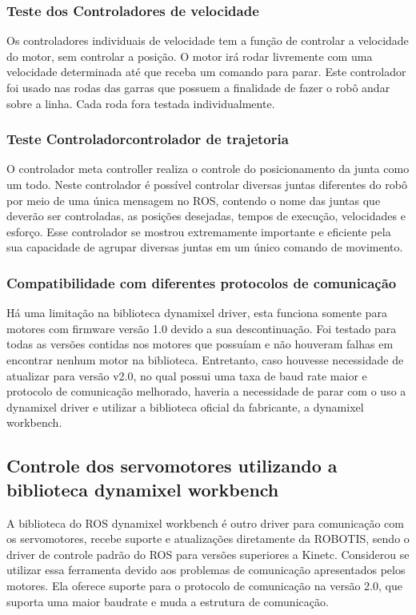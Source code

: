 \subsubsection{Teste dos Controladores de velocidade}
Os controladores individuais de velocidade tem a função de controlar a velocidade do motor, sem controlar a posição. O motor irá rodar livremente com uma velocidade determinada até que receba um comando para parar. Este controlador foi usado nas rodas das garras que possuem a finalidade de fazer o robô andar sobre a linha. Cada roda fora testada individualmente.

\subsubsection{Teste Controladorcontrolador de trajetoria}
O controlador meta controller realiza o controle do posicionamento da junta como um todo. Neste controlador é possível controlar diversas juntas diferentes do robô por meio de uma única mensagem no ROS, contendo o nome das juntas que deverão ser controladas, as posições desejadas, tempos de execução, velocidades e esforço. Esse controlador se mostrou extremamente importante e eficiente pela sua capacidade de agrupar diversas juntas em um único comando de movimento. 

\subsubsection{Compatibilidade com diferentes protocolos de comunicação}
Há uma limitação na biblioteca dynamixel driver, esta funciona somente para motores com firmware versão 1.0 devido a sua descontinuação. Foi testado para todas as versões contidas nos motores que possuíam e não houveram falhas em encontrar nenhum motor na biblioteca. Entretanto, caso houvesse necessidade de atualizar para versão v2.0, no qual possui uma taxa de baud rate maior e protocolo de comunicação melhorado, haveria a necessidade de parar com o uso a dynamixel driver e utilizar a biblioteca oficial da fabricante, a dynamixel workbench.

\subsection{Controle dos servomotores utilizando a biblioteca dynamixel workbench}
A biblioteca do ROS dynamixel workbench  é outro driver para comunicação com os servomotores, recebe suporte e atualizações diretamente da ROBOTIS, sendo o driver de controle padrão do ROS para versões superiores a Kinetc. Considerou se utilizar essa ferramenta devido aos problemas de comunicação apresentados pelos motores. Ela oferece suporte para o protocolo de comunicação na versão 2.0, que suporta uma maior baudrate e muda a estrutura de comunicação.

